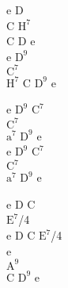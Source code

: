 \begin{chord}
    e D\\
    C $\mathrm{H^7}$\\
    C D e\\
    e $\mathrm{D^9}$\\
    $\mathrm{C^7}$\\
    $\mathrm{H^7}$ C $\mathrm{D^9}$ e

    e $\mathrm{D^9}$ $\mathrm{C^7}$\\
    $\mathrm{C^7}$\\
    $\mathrm{a^7}$ $\mathrm{D^9}$ e\\
    e $\mathrm{D^9}$ $\mathrm{C^7}$\\
    $\mathrm{C^7}$\\
    $\mathrm{a^7}$ $\mathrm{D^9}$ e

    e D C\\
    $\mathrm{E^7}$/4\\
    e D C $\mathrm{E^7}$/4\\
    e\\
    $\mathrm{A^9}$\\
    C $\mathrm{D^9}$ e
\end{chord}
